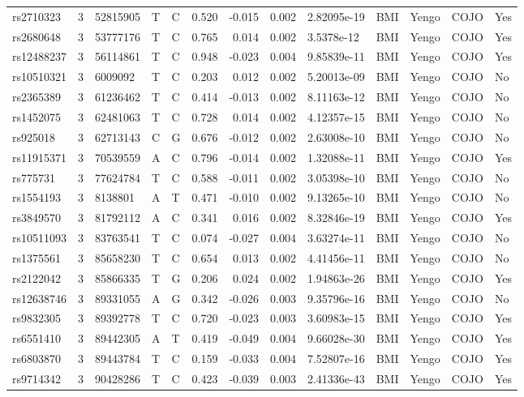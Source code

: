 \documentclass[11pt,twoside]{bristolthesis}
\begin{document}
\begin{longtable}[t]{lrlllrrrlllll}
rs2710323 & 3 & 52815905 & T & C & 0.520 & -0.015 & 0.002 & 2.82095e-19 & BMI & Yengo & COJO & Yes\\
rs2680648 & 3 & 53777176 & T & C & 0.765 & 0.014 & 0.002 & 3.5378e-12 & BMI & Yengo & COJO & Yes\\
rs12488237 & 3 & 56114861 & T & C & 0.948 & -0.023 & 0.004 & 9.85839e-11 & BMI & Yengo & COJO & Yes\\
rs10510321 & 3 & 6009092 & T & C & 0.203 & 0.012 & 0.002 & 5.20013e-09 & BMI & Yengo & COJO & No\\
\addlinespace
rs2365389 & 3 & 61236462 & T & C & 0.414 & -0.013 & 0.002 & 8.11163e-12 & BMI & Yengo & COJO & No\\
rs1452075 & 3 & 62481063 & T & C & 0.728 & 0.014 & 0.002 & 4.12357e-15 & BMI & Yengo & COJO & No\\
rs925018 & 3 & 62713143 & C & G & 0.676 & -0.012 & 0.002 & 2.63008e-10 & BMI & Yengo & COJO & No\\
rs11915371 & 3 & 70539559 & A & C & 0.796 & -0.014 & 0.002 & 1.32088e-11 & BMI & Yengo & COJO & Yes\\
rs775731 & 3 & 77624784 & T & C & 0.588 & -0.011 & 0.002 & 3.05398e-10 & BMI & Yengo & COJO & No\\
\addlinespace
rs1554193 & 3 & 8138801 & A & T & 0.471 & -0.010 & 0.002 & 9.13265e-10 & BMI & Yengo & COJO & No\\
rs3849570 & 3 & 81792112 & A & C & 0.341 & 0.016 & 0.002 & 8.32846e-19 & BMI & Yengo & COJO & Yes\\
rs10511093 & 3 & 83763541 & T & C & 0.074 & -0.027 & 0.004 & 3.63274e-11 & BMI & Yengo & COJO & No\\
rs1375561 & 3 & 85658230 & T & C & 0.654 & 0.013 & 0.002 & 4.41456e-11 & BMI & Yengo & COJO & No\\
rs2122042 & 3 & 85866335 & T & G & 0.206 & 0.024 & 0.002 & 1.94863e-26 & BMI & Yengo & COJO & Yes\\
\addlinespace
rs12638746 & 3 & 89331055 & A & G & 0.342 & -0.026 & 0.003 & 9.35796e-16 & BMI & Yengo & COJO & No\\
rs9832305 & 3 & 89392778 & T & C & 0.720 & -0.023 & 0.003 & 3.60983e-15 & BMI & Yengo & COJO & Yes\\
rs6551410 & 3 & 89442305 & A & T & 0.419 & -0.049 & 0.004 & 9.66028e-30 & BMI & Yengo & COJO & Yes\\
rs6803870 & 3 & 89443784 & T & C & 0.159 & -0.033 & 0.004 & 7.52807e-16 & BMI & Yengo & COJO & Yes\\
rs9714342 & 3 & 90428286 & T & C & 0.423 & -0.039 & 0.003 & 2.41336e-43 & BMI & Yengo & COJO & Yes\\

\end{longtable}
\end{document}
